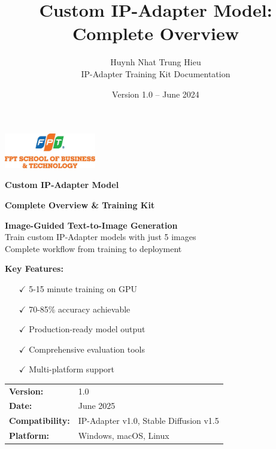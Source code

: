 \documentclass[11pt,a4paper]{article}
\title{\textbf{Custom IP-Adapter Model: Complete Overview}}
\author{Huynh Nhat Trung Hieu\\IP-Adapter Training Kit Documentation}
\date{Version 1.0 -- June 2024}
\begin{document}
\begin{titlepage}
    \centering
    
    \vspace{2cm}
    \includegraphics[width=0.3\textwidth]{logo.jpg}
    
    \vspace{2cm}
    
    {\Huge\textbf{Custom IP-Adapter Model}}
    
    \vspace{0.5cm}
    {\Large\textbf{Complete Overview \& Training Kit}}
    
    \vspace{3cm}
    
    \begin{tcolorbox}[colback=blue!5!white,colframe=blue!75!black,width=0.8\textwidth]
    \centering
    \large
    \textbf{Image-Guided Text-to-Image Generation}\\
    \vspace{0.3cm}
    Train custom IP-Adapter models with just 5 images\\
    Complete workflow from training to deployment
    \end{tcolorbox}
    
    \vspace{2cm}
    
    \begin{minipage}{0.7\textwidth}
    \centering
    \textbf{Key Features:}
    \begin{itemize}
        \item[$\checkmark$] 5-15 minute training on GPU
        \item[$\checkmark$] 70-85\% accuracy achievable  
        \item[$\checkmark$] Production-ready model output
        \item[$\checkmark$] Comprehensive evaluation tools
        \item[$\checkmark$] Multi-platform support
    \end{itemize}
    \end{minipage}
    
    \vfill
    
    \begin{tabular}{@{}ll@{}}
    \textbf{Version:} & 1.0 \\
    \textbf{Date:} & June 2025 \\
    \textbf{Compatibility:} & IP-Adapter v1.0, Stable Diffusion v1.5 \\
    \textbf{Platform:} & Windows, macOS, Linux \\
    \end{tabular}
    

\end{titlepage}
\end{document}
